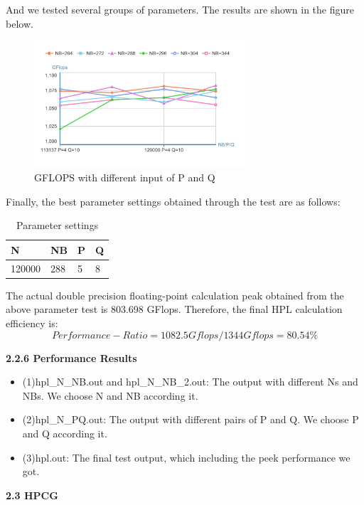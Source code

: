 \documentclass[a4paper,12pt]{article}
\begin{document}
And we tested several groups of parameters. The results are shown in the figure below.

\begin{figure}[H]
    \centering
    \includegraphics[width=0.7\textwidth]{GFLOPS_PQ_NB.png}
    \caption{GFLOPS with different input of P and Q}
    \label{fig:gflops_pq_nb}
\end{figure}

Finally, the best parameter settings obtained through the test are as follows:
\begin{table}[H]
\centering
\caption{Parameter settings}
\vspace{0.5cm}
\begin{tabular}{llll}
\toprule
N & NB & P & Q \\
\midrule
120000 & 288 & 5 & 8 \\
\bottomrule
\end{tabular}
\end{table}

The actual double precision floating-point calculation peak obtained from the above parameter test is 803.698 GFlops. Therefore, the final HPL calculation efficiency is:
\begin{equation*}
Performance-Ratio = 1082.5Gflops/1344Gflops = 80.54\%
\end{equation*}

\textbf{2.2.6 Performance Results}
\begin{itemize}
    \item (1)hpl\_N\_NB.out and hpl\_N\_NB\_2.out: The output with different Ns and NBs. We choose N and NB according it.
    \item (2)hpl\_N\_PQ.out: The output with different pairs of P and Q. We choose P and Q according it.
    \item (3)hpl.out: The final test output, which including the peek performance we got.
\end{itemize}

\textbf{2.3 HPCG}
\end{document}
